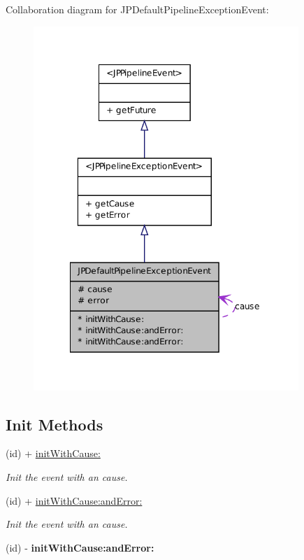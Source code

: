 Collaboration diagram for JPDefaultPipelineExceptionEvent:\nopagebreak
\begin{figure}[H]
\begin{center}
\leavevmode
\includegraphics[width=284pt]{a00101}
\end{center}
\end{figure}
\subsection*{Init Methods}
\begin{DoxyCompactItemize}
\item 
(id) + \hyperlink{a00013_a75373c54d3c579331c6e08f133ef06f3}{initWithCause:}
\begin{DoxyCompactList}\small\item\em Init the event with an cause. \item\end{DoxyCompactList}\item 
(id) + \hyperlink{a00013_a9d2e38b2c6c789a9b94b6e5be50746d0}{initWithCause:andError:}
\begin{DoxyCompactList}\small\item\em Init the event with an cause. \item\end{DoxyCompactList}\item 
\hypertarget{a00013_a9d2e38b2c6c789a9b94b6e5be50746d0}{
(id) -\/ {\bfseries initWithCause:andError:}}
\label{a00013_a9d2e38b2c6c789a9b94b6e5be50746d0}

\end{DoxyCompactItemize}


